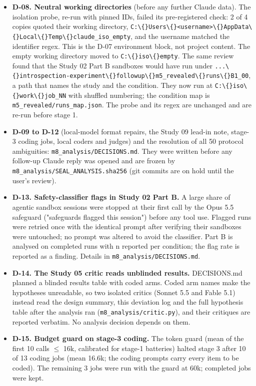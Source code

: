 \begin{itemize}
\item \textbf{D-08. Neutral working directories} (before any further Claude data). The isolation probe, re-run with pinned IDs, failed its pre-registered check: 2 of 4 copies quoted their working directory, \texttt{C:\textbackslash\{\}Users\textbackslash\{\}<username>\textbackslash\{\}AppData\textbackslash\{\}Local\textbackslash\{\}Temp\textbackslash\{\}claude\_iso\_empty}, and the username matched the identifier regex. This is the D-07 environment block, not project content. The empty working directory moved to \texttt{C:\textbackslash\{\}iso\textbackslash\{\}empty}. The same review found that the Study 02 Part B sandboxes would have run under \texttt{...\textbackslash\{\}introspection-experiment\textbackslash\{\}followup\textbackslash\{\}m5\_revealed\textbackslash\{\}runs\textbackslash\{\}B1\_00}, a path that names the study and the condition. They now run at \texttt{C:\textbackslash\{\}iso\textbackslash\{\}work\textbackslash\{\}job\_NN} with shuffled numbering; the condition map is \texttt{m5\_revealed/runs\_map.json}. The probe and its regex are unchanged and are re-run before stage 1.
\item \textbf{D-09 to D-12} (local-model format repairs, the Study 09 lead-in note, stage-3 coding jobs, local coders and judges) and the resolution of all 50 protocol ambiguities: \texttt{m8\_analysis/DECISIONS.md}. They were written before any follow-up Claude reply was opened and are frozen by \texttt{m8\_analysis/SEAL\_ANALYSIS.sha256} (git commits are on hold until the user's review).
\item \textbf{D-13. Safety-classifier flags in Study 02 Part B.} A large share of agentic sandbox sessions were stopped at their first call by the Opus 5.5 safeguard ("safeguards flagged this session") before any tool use. Flagged runs were retried once with the identical prompt after verifying their sandboxes were untouched; no prompt was altered to avoid the classifier. Part B is analysed on completed runs with n reported per condition; the flag rate is reported as a finding. Details in \texttt{m8\_analysis/DECISIONS.md}.
\item \textbf{D-14. The Study 05 critic reads unblinded results.} DECISIONS.md planned a blinded results table with coded arms. Coded arm names make the hypotheses unreadable, so two isolated critics (Sonnet 5.5 and Fable 5.1) instead read the design summary, this deviation log and the full hypothesis table after the analysis ran (\texttt{m8\_analysis/critic.py}), and their critiques are reported verbatim. No analysis decision depends on them.
\item \textbf{D-15. Budget guard on stage-3 coding.} The token guard (mean of the first 10 calls $\leq$ 16k, calibrated for stage-1 batteries) halted stage 3 after 10 of 13 coding jobs (mean 16.6k; the coding prompts carry every item to be coded). The remaining 3 jobs were run with the guard at 60k; completed jobs were kept.
\end{itemize}
